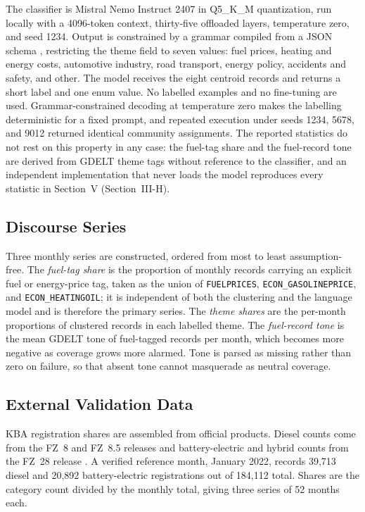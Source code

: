 \documentclass[conference]{IEEEtran}
\begin{document}
The classifier is Mistral Nemo Instruct 2407 \cite{mistralnemo} in Q5\_K\_M
quantization, run locally with a 4096-token context, thirty-five offloaded
layers, temperature zero, and seed 1234. Output is constrained by a grammar
compiled from a JSON schema \cite{willard2023}, restricting the theme field to
seven values: fuel prices, heating and energy costs, automotive industry, road
transport, energy policy, accidents and safety, and other. The model receives
the eight centroid records and returns a short label and one enum value. No
labelled examples and no fine-tuning are used. Grammar-constrained decoding at
temperature zero makes the labelling deterministic for a fixed prompt, and
repeated execution under seeds 1234, 5678, and 9012 returned identical community
assignments. The reported statistics do not rest on this property in any case:
the fuel-tag share and the fuel-record tone are derived from GDELT theme tags
without reference to the classifier, and an independent implementation that
never loads the model reproduces every statistic in Section~V
(Section~III-H).

\subsection{Discourse Series}
Three monthly series are constructed, ordered from most to least
assumption-free. The \emph{fuel-tag share} is the proportion of monthly records
carrying an explicit fuel or energy-price tag, taken as the union of
\texttt{FUELPRICES}, \texttt{ECON\_GASOLINEPRICE}, and
\texttt{ECON\_HEATINGOIL}; it is independent of both the clustering and the
language model and is therefore the primary series. The \emph{theme shares} are
the per-month proportions of clustered records in each labelled theme. The
\emph{fuel-record tone} is the mean GDELT tone of fuel-tagged records per month,
which becomes more negative as coverage grows more alarmed. Tone is parsed as
missing rather than zero on failure, so that absent tone cannot masquerade as
neutral coverage.

\subsection{External Validation Data}
KBA registration shares are assembled from official products. Diesel counts come
from the FZ~8 and FZ~8.5 releases \cite{kbafz8} and battery-electric and hybrid
counts from the FZ~28 release \cite{kbafz28}. A verified reference month,
January 2022, records 39{,}713 diesel and 20{,}892 battery-electric
registrations out of 184{,}112 total. Shares are the category count divided by
the monthly total, giving three series of 52 months each.
\end{document}
